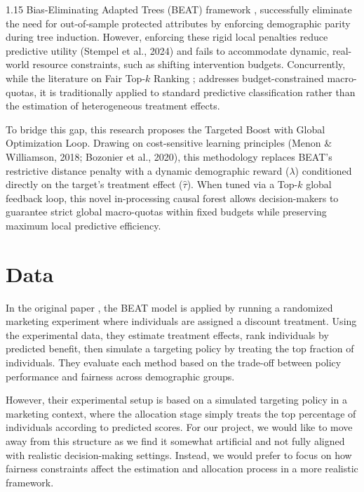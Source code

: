 \documentclass[11pt, a4paper]{article}
\begin{document}
\begin{spacing}{1.15}
Bias-Eliminating Adapted Trees (BEAT) framework \cite{ascarza2022eliminating}, successfully eliminate the need for out-of-sample protected attributes by enforcing demographic parity during tree induction. However, enforcing these rigid local penalties reduce predictive utility (Stempel et al., 2024) and fails to accommodate dynamic, real-world resource constraints, such as shifting intervention budgets. Concurrently, while the literature on Fair Top-$k$ Ranking \cite{zehlike2017fa}; \cite{singh2018fairness} addresses budget-constrained macro-quotas, it is traditionally applied to standard predictive classification rather than the estimation of heterogeneous treatment effects.

To bridge this gap, this research proposes the Targeted Boost with Global Optimization Loop. Drawing on cost-sensitive learning principles (Menon & Williamson, 2018; Bozonier et al., 2020), this methodology replaces BEAT’s restrictive distance penalty with a dynamic demographic reward ($\lambda$) conditioned directly on the target's treatment effect ($\hat{\tau}$). When tuned via a Top-$k$ global feedback loop, this novel in-processing causal forest allows decision-makers to guarantee strict global macro-quotas within fixed budgets while preserving maximum local predictive efficiency.

\section{Data}
In the original paper \cite{ascarza2022eliminating}, the BEAT model is applied by running a randomized marketing experiment where individuals are assigned a discount treatment. Using the experimental data, they estimate treatment effects, rank individuals by predicted benefit, then simulate a targeting policy by treating the top fraction of individuals. They evaluate each method based on the trade-off between policy performance and fairness across demographic groups.

However, their experimental setup is based on a simulated targeting policy in a marketing context, where the allocation stage simply treats the top percentage of individuals according to predicted scores. For our project, we would like to move away from this structure as we find it somewhat artificial and not fully aligned with realistic decision-making settings. Instead, we would prefer to focus on how fairness constraints affect the estimation and allocation process in a more realistic framework.


\end{spacing}
\end{document}
